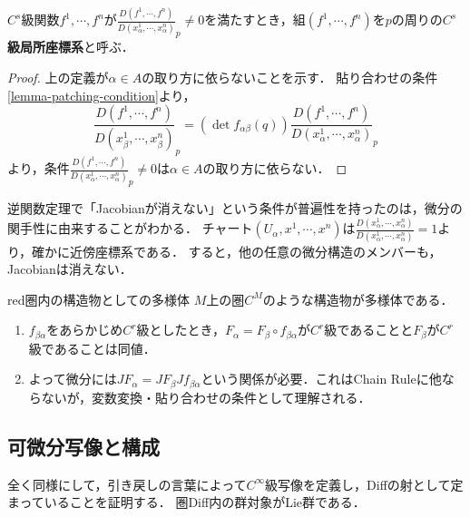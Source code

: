 \documentclass[uplatex,dvipdfmx]{jsreport}
\begin{document}
\begin{lemma}[局所座標系]
    $C^s$級関数$f^1,\cdots,f^n$が$\frac{D(f^1,\cdots,f^n)}{D(x^1_\alpha,\cdots,x^n_\alpha)}_p\ne 0$を満たすとき，組$(f^1,\cdots,f^n)$を$p$の周りの\textbf{$C^s$級局所座標系}と呼ぶ．
\end{lemma}
\begin{proof}
    上の定義が$\alpha\in A$の取り方に依らないことを示す．
    貼り合わせの条件\ref{lemma-patching-condition}より，
    \[\frac{D(f^1,\cdots,f^n)}{D(x^1_\beta,\cdots,x^n_\beta)}_p=(\det f_{\alpha\beta}(q))\frac{D(f^1,\cdots,f^n)}{D(x^1_\alpha,\cdots,x^n_\alpha)}_p\]
    より，条件$\frac{D(f^1,\cdots,f^n)}{D(x^1_\alpha,\cdots,x^n_\alpha)}_p\ne 0$は$\alpha\in A$の取り方に依らない．
\end{proof}
\begin{remark}[逆関数定理の一般化と思えば良い]\label{remark-generalization-of-inverse-mapping-theorem}
    逆関数定理で「Jacobianが消えない」という条件が普遍性を持ったのは，微分の関手性に由来することがわかる．
    チャート$(U_\alpha,x^1,\cdots,x^n)$は$\frac{D(x^1_\alpha,\cdots,x^n_\alpha)}{D(x^1_\alpha,\cdots,x^n_\alpha)}=1$より，確かに近傍座標系である．
    すると，他の任意の微分構造のメンバーも，Jacobianは消えない．
\end{remark}

\begin{tbox}{red}{圏内の構造物としての多様体}
    $M$上の圏$C^M$のような構造物が多様体である．
    \begin{enumerate}
        \item $f_{\beta\alpha}$をあらかじめ$C^r$級としたとき，$F_\alpha=F_\beta\circ f_{\beta\alpha}$が$C^r$級であることと$F_\beta$が$C^r$級であることは同値．
        \item よって微分には$JF_\alpha=JF_\beta Jf_{\beta\alpha}$という関係が必要．これはChain Ruleに他ならないが，変数変換・貼り合わせの条件として理解される．
    \end{enumerate}
\end{tbox}

\subsection{可微分写像と構成}

\begin{tcolorbox}[colframe=ForestGreen, colback=ForestGreen!10!white,breakable,colbacktitle=ForestGreen!40!white,coltitle=black,fonttitle=\bfseries\sffamily,
title=]
    全く同様にして，引き戻しの言葉によって$C^\infty$級写像を定義し，Diffの射として定まっていることを証明する．
    圏Diff内の群対象がLie群である．
\end{tcolorbox}
\end{document}
